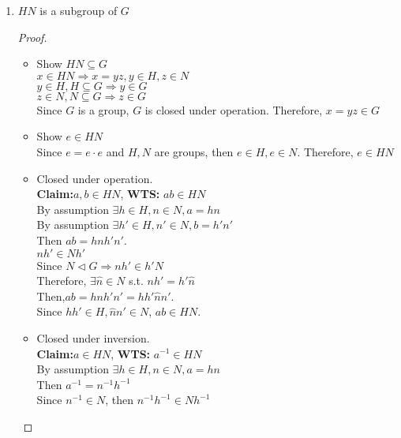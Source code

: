 \documentclass[12pt]{article}
\begin{document}
\begin{itemize}
\begin{enumerate}
\begin{enumerate}
            \item $HN$ is a subgroup of $G$
            \begin{proof}
                \begin{itemize}
                    \item Show $HN \subseteq G$\\
                    $x \in HN \Rightarrow x = yz, y \in H, z \in N$\\
                    $y \in H, H \subseteq G \Rightarrow y \in G$\\
                    $z \in N, N \subseteq G \Rightarrow z \in G$\\
                    Since $G$ is a group, $G$ is closed under operation. Therefore, $x = yz \in G$
                    \item Show $e \in HN$\\
                    Since $e = e\cdot e$ and $H, N$ are groups, then $e \in H, e \in N$.
                    Therefore, $e \in HN$
                    \item Closed under operation.\\
                    \textbf{Claim:}$a, b \in HN$, \textbf{WTS:} $ab \in HN$\\
                    By assumption $ \exists h \in H, n \in N, a = hn$\\
                    By assumption $ \exists h' \in H, n' \in N, b = h'n'$\\
                    Then $ab = hnh'n'$.\\
                    $nh' \in Nh'$\\
                    Since $N \triangleleft G \Rightarrow nh' \in h'N$\\
                    Therefore, $\exists \hat{n} \in N $ s.t. $nh' = h'\hat{n}$\\
                    Then,$ab = hnh'n' = hh'\hat{n}n'$.\\
                    Since $hh' \in H, \hat{n}n' \in N$, $ab \in HN$.
                    \item Closed under inversion.\\
                    \textbf{Claim:}$a \in HN$, \textbf{WTS:} $a^{-1} \in HN$\\
                    By assumption $\exists h \in H, n \in N, a = hn$\\
                    Then $a^{-1} = n^{-1}h^{-1}$\\
                    Since $n^{-1} \in N$, then $n^{-1}h^{-1} \in Nh^{-1}$\\

\end{itemize}
\end{proof}
\end{enumerate}
\end{enumerate}
\end{itemize}
\end{document}
